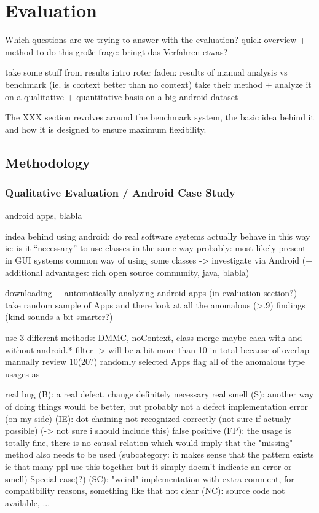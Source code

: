 \chapter{Evaluation}\label{ch:eval}

Which questions are we trying to answer with the evaluation?
quick overview + method to do this
große frage: bringt das Verfahren etwas?

take some stuff from results intro
roter faden: results of manual analysis vs benchmark (ie. is context better than no context)
take their method + analyze it on a qualitative + quantitative basis on a big android dataset

The XXX section revolves around the benchmark system, the basic idea behind it and how it is designed to ensure maximum flexibility.


\section{Methodology}

\subsection{Qualitative Evaluation / Android Case Study}
android apps, blabla

indea behind using android:
    do real software systems actually behave in this way
    ie: is it ``necessary'' to use classes in the same way
    probably: most likely present in GUI systems
    common way of using some classes -> investigate via Android (+ additional advantages: rich open source community, java, blabla)

downloading + automatically analyzing android apps (in evaluation section?)
take random sample of Apps and there look at all the anomalous (>.9) findings (kind sounds a bit smarter?)

use 3 different methods: DMMC, noContext, class merge
maybe each with and without android.* filter -> will be a bit more than 10 in total because of overlap
manually review 10(20?) randomly selected Apps
flag all of the anomalous type usages as

real bug (B): a real defect, change definitely necessary
real smell (S): another way of doing things would be better, but probably not a defect
implementation error (on my side) (IE): dot chaining not recognized correctly (not sure if actualy possible) (-> not sure i should include this)
false positive (FP): the usage is totally fine, there is no causal relation which would imply that the "missing" method also needs to be used
	(subcategory: it makes sense that the pattern exists ie that many ppl use this together but it simply doesn't indicate an error or smell)
Special case(?) (SC): "weird" implementation with extra comment, for compatibility reasons, something like that
not clear (NC): source code not available, ...

